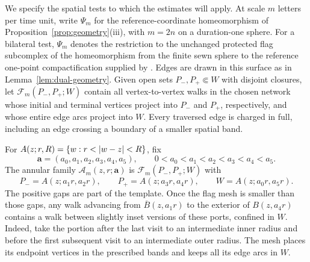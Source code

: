 We specify the spatial tests to which the estimates will apply.  At scale
\(m\) letters per time unit, write \(\Psi_m\) for the reference-coordinate
homeomorphism of Proposition~\ref{prop:geometry}(iii), with \(m=2n\) on a
duration-one sphere.  For a bilateral test, \(\Psi_m\) denotes the
restriction to the unchanged protected flag subcomplex of the homeomorphism
from the finite sewn sphere to the reference one-point compactification
supplied by \cite[Proposition~4.9]{C}.  Edges are drawn in this surface as
in Lemma~\ref{lem:dual-geometry}.  Given open sets
\(P_-,P_+\Subset W\) with disjoint closures, let
\(\mathcal F_m(P_-,P_+;W)\) contain all vertex-to-vertex walks in the chosen
network whose initial and terminal vertices project into \(P_-\) and
\(P_+\), respectively, and whose entire edge arcs project into \(W\).
Every traversed edge is charged in full, including an edge crossing a
boundary of a smaller spatial band.

For \(A(z;r,R)=\{w:r<\lvert w-z\rvert<R\}\), fix
\[
 \mathbf a=(a_0,a_1,a_2,a_3,a_4,a_5),
 \qquad 0<a_0<a_1<a_2<a_3<a_4<a_5.
\]
The annular family \(\mathcal A_m(z,r;\mathbf a)\) is
\(\mathcal F_m(P_-,P_+;W)\) with
\begin{equation}\label{eq:annular-template}
 P_-=A(z;a_1r,a_2r),\qquad
 P_+=A(z;a_3r,a_4r),\qquad
 W=A(z;a_0r,a_5r).
\end{equation}
The positive gaps are part of the template.  Once the flag mesh is smaller
than those gaps, any walk advancing from \(\overline B(z,a_1r)\) to the
exterior of \(B(z,a_4r)\) contains a walk between slightly inset versions
of these ports, confined in \(W\).  Indeed, take the portion after the last
visit to an intermediate inner radius and before the first subsequent visit
to an intermediate outer radius.  The mesh places its endpoint vertices in
the prescribed bands and keeps all its edge arcs in \(W\).

